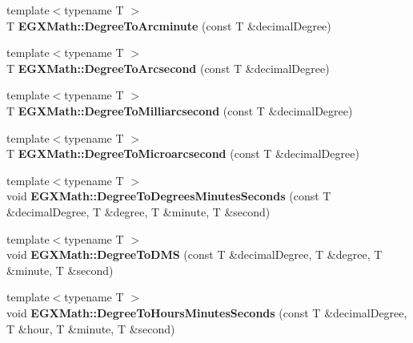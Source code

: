 \begin{DoxyCompactItemize}
{\footnotesize template$<$typename T $>$ }\\T {\bfseries E\+G\+X\+Math\+::\+Degree\+To\+Arcminute} (const T \&decimal\+Degree)
\item 
\mbox{\label{group___e_g_x_math-_angle_conversions_gaf85e2d765c248f447854a807a68a5de8}} 
{\footnotesize template$<$typename T $>$ }\\T {\bfseries E\+G\+X\+Math\+::\+Degree\+To\+Arcsecond} (const T \&decimal\+Degree)
\item 
\mbox{\label{group___e_g_x_math-_angle_conversions_ga2c218e286b2ef72a00734dbc5a7f5ab6}} 
{\footnotesize template$<$typename T $>$ }\\T {\bfseries E\+G\+X\+Math\+::\+Degree\+To\+Milliarcsecond} (const T \&decimal\+Degree)
\item 
\mbox{\label{group___e_g_x_math-_angle_conversions_ga31b65388fe1b4656663b3d66b9d764e6}} 
{\footnotesize template$<$typename T $>$ }\\T {\bfseries E\+G\+X\+Math\+::\+Degree\+To\+Microarcsecond} (const T \&decimal\+Degree)
\item 
\mbox{\label{group___e_g_x_math-_angle_conversions_ga1b244e5ea02401c46d56f3bda1d81376}} 
{\footnotesize template$<$typename T $>$ }\\void {\bfseries E\+G\+X\+Math\+::\+Degree\+To\+Degrees\+Minutes\+Seconds} (const T \&decimal\+Degree, T \&degree, T \&minute, T \&second)
\item 
\mbox{\label{group___e_g_x_math-_angle_conversions_ga7eb8f0b012002f2cfa4d78a7ca0299de}} 
{\footnotesize template$<$typename T $>$ }\\void {\bfseries E\+G\+X\+Math\+::\+Degree\+To\+D\+MS} (const T \&decimal\+Degree, T \&degree, T \&minute, T \&second)
\item 
\mbox{\label{group___e_g_x_math-_angle_conversions_ga770b13da33b6f6c7bfa398cca7f24dbe}} 
{\footnotesize template$<$typename T $>$ }\\void {\bfseries E\+G\+X\+Math\+::\+Degree\+To\+Hours\+Minutes\+Seconds} (const T \&decimal\+Degree, T \&hour, T \&minute, T \&second)

\end{DoxyCompactItemize}
